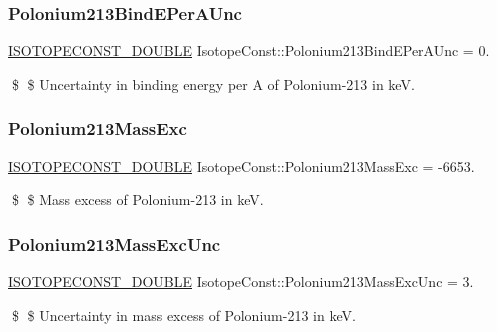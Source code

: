 \subsubsection{\texorpdfstring{Polonium213\+Bind\+E\+Per\+A\+Unc}{Polonium213BindEPerAUnc}}
{\footnotesize\ttfamily \mbox{\hyperlink{group___isotope_const-_macros_ga8f45a7272ce02c0b4c65c44636ed719a}{I\+S\+O\+T\+O\+P\+E\+C\+O\+N\+S\+T\+\_\+\+D\+O\+U\+B\+LE}} Isotope\+Const\+::\+Polonium213\+Bind\+E\+Per\+A\+Unc = 0.}

\$ \$ Uncertainty in binding energy per A of Polonium-\/213 in keV. \mbox{\label{group___isotope_const-_polonium-_po213_gac4c8c9083640bd9eb436e688c36599cd}} 
\subsubsection{\texorpdfstring{Polonium213\+Mass\+Exc}{Polonium213MassExc}}
{\footnotesize\ttfamily \mbox{\hyperlink{group___isotope_const-_macros_ga8f45a7272ce02c0b4c65c44636ed719a}{I\+S\+O\+T\+O\+P\+E\+C\+O\+N\+S\+T\+\_\+\+D\+O\+U\+B\+LE}} Isotope\+Const\+::\+Polonium213\+Mass\+Exc = -\/6653.}

\$ \$ Mass excess of Polonium-\/213 in keV. \mbox{\label{group___isotope_const-_polonium-_po213_gae2a32661c2741668daa1f5a099826f45}} 
\subsubsection{\texorpdfstring{Polonium213\+Mass\+Exc\+Unc}{Polonium213MassExcUnc}}
{\footnotesize\ttfamily \mbox{\hyperlink{group___isotope_const-_macros_ga8f45a7272ce02c0b4c65c44636ed719a}{I\+S\+O\+T\+O\+P\+E\+C\+O\+N\+S\+T\+\_\+\+D\+O\+U\+B\+LE}} Isotope\+Const\+::\+Polonium213\+Mass\+Exc\+Unc = 3.}

\$ \$ Uncertainty in mass excess of Polonium-\/213 in keV. \mbox{\label{group___isotope_const-_polonium-_po213_gaacfed22d907ccd2d92b8512e03ebe974}} 

